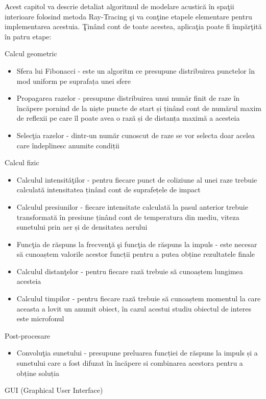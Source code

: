 Acest capitol va descrie detaliat algoritmul de modelare acustic\u{a} \^{i}n spa\c{t}ii interioare folosind metoda Ray-Tracing \c{s}i va con\c{t}ine etapele elementare pentru implementarea acestuia. \c{T}in\^{a}nd cont de toate acestea, aplica\c{t}ia poate fi \^{i}mp\u{a}r\c{t}it\u{a} \^{i}n patru etape:
\begin{enumerate}
	\utb Calcul geometric
	\begin{itemize}
		\item Sfera lui Fibonacci - este un algoritm ce presupune distribuirea punctelor în mod uniform pe suprafața unei sfere
		\item Propagarea razelor - presupune distribuirea unui număr finit de raze în încăpere pornind de la niște puncte de start și ținând cont de numărul maxim de reflexii pe care îl poate avea o rază și de distanța maximă a acesteia
		\item Selec\c{t}ia razelor - dintr-un număr cunoscut de raze se vor selecta doar acelea care îndeplinesc anumite condiții
	\end{itemize}
	\utb Calcul fizic
	\begin{itemize}
		\item Calculul intensit\u{a}\c{t}ilor - pentru fiecare punct de coliziune al unei raze trebuie calculată intensitatea ținând cont de suprafețele de impact
		\item Calculul presiunilor - fiecare intensitate calculată la pasul anterior trebuie transformată în presiune ținând cont de temperatura din mediu, viteza sunetului prin aer și de densitatea aerului
		\item Func\c{t}ia de r\u{a}spuns la frecven\c{t}\u{a} \c{s}i func\c{t}ia de r\u{a}spuns la impuls - este necesar să cunoaștem valorile acestor funcții pentru a putea obține rezultatele finale
		\item Calculul distan\c{t}elor - pentru fiecare rază trebuie să cunoaștem lungimea acesteia
		\item Calculul timpilor - pentru fiecare rază trebuie să cunoaștem momentul la care aceasta a lovit un anumit obiect, în cazul acestui studiu obiectul de interes este microfonul
	\end{itemize}
	\utb Post-procesare 
	\begin{itemize}
		\item Convolu\c{t}ia sunetului - presupune preluarea funcției de răspuns la impuls și a sunetului care a fost difuzat în încăpere si combinarea acestora pentru a obține soluția
	\end{itemize}
	\utb GUI (Graphical User Interface)
\end{enumerate}
 

